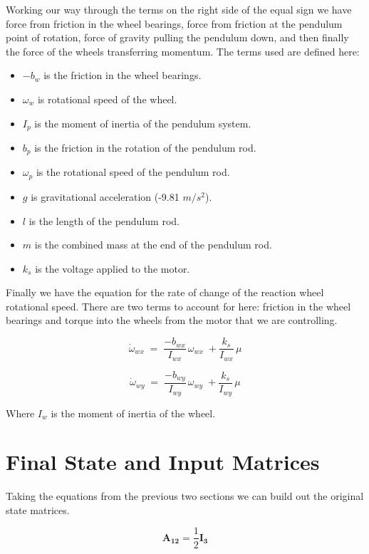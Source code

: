 \documentclass{article}
\begin{document}
\noindent Working our way through the terms on the right side of the equal 
sign we have force from friction in the wheel bearings, force from friction
at the pendulum point of rotation, force of gravity pulling the pendulum 
down, and then finally the force of the wheels transferring momentum. The 
terms used are defined here:
\begin{itemize}
\setlength{\itemindent}{.5in}
\item $-b_w$ is the friction in the wheel bearings.
\item $\omega_w$ is rotational speed of the wheel.
\item $I_p$ is the moment of inertia of the pendulum system.
\item $b_p$ is the friction in the rotation of the pendulum rod.
\item $\omega_p$ is the rotational speed of the pendulum rod.
\item $g$ is gravitational acceleration (-9.81 $m/s^2$).
\item $l$ is the length of the pendulum rod.
\item $m$ is the combined mass at the end of the pendulum rod.
\item $k_s$ is the voltage applied to the motor.
\end{itemize}

\noindent Finally we have the equation for the rate of change of the 
reaction wheel rotational speed. There are two terms to account for 
here: friction in the wheel bearings and torque into the wheels from
the motor that we are controlling.

$$\dot{\omega}_{wx}\; =\;
\frac{-b_{wx}}{I_{wx}}\,\omega_{wx}\;
+ \frac{k_s}{I_{wx}}\,\mu$$

$$\dot{\omega}_{wy}\; =\;
\frac{-b_{wy}}{I_{wy}}\,\omega_{wy}\;
+ \frac{k_s}{I_{wy}}\,\mu$$


\noindent Where $I_w$ is the moment of inertia of the wheel.

\section*{\small Final State and Input Matrices}
Taking the equations from the previous two sections we can build
out the original state matrices.

$$\boldsymbol{A_{12}} = \frac{1}{2}\boldsymbol{I_3}$$
\end{document}
